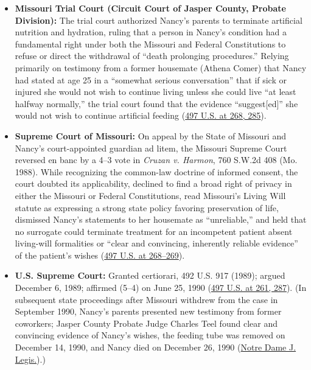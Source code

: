 \documentclass[12pt]{article}
\begin{document}
\begin{itemize}
  \item \textbf{Missouri Trial Court (Circuit Court of Jasper County, Probate Division):} The trial court authorized Nancy's parents to terminate artificial nutrition and hydration, ruling that a person in Nancy's condition had a fundamental right under both the Missouri and Federal Constitutions to refuse or direct the withdrawal of ``death prolonging procedures.'' Relying primarily on testimony from a former housemate (Athena Comer) that Nancy had stated at age 25 in a ``somewhat serious conversation'' that if sick or injured she would not wish to continue living unless she could live ``at least halfway normally,'' the trial court found that the evidence ``suggest[ed]'' she would not wish to continue artificial feeding (\href{https://supreme.justia.com/cases/federal/us/497/261/}{497 U.S. at 268, 285}).
  \item \textbf{Supreme Court of Missouri:} On appeal by the State of Missouri and Nancy's court-appointed guardian ad litem, the Missouri Supreme Court reversed en banc by a 4--3 vote in \textit{Cruzan v. Harmon}, 760 S.W.2d 408 (Mo. 1988). While recognizing the common-law doctrine of informed consent, the court doubted its applicability, declined to find a broad right of privacy in either the Missouri or Federal Constitutions, read Missouri's Living Will statute as expressing a strong state policy favoring preservation of life, dismissed Nancy's statements to her housemate as ``unreliable,'' and held that no surrogate could terminate treatment for an incompetent patient absent living-will formalities or ``clear and convincing, inherently reliable evidence'' of the patient's wishes (\href{https://supreme.justia.com/cases/federal/us/497/261/}{497 U.S. at 268--269}).
  \item \textbf{U.S. Supreme Court:} Granted certiorari, 492 U.S. 917 (1989); argued December 6, 1989; affirmed (5--4) on June 25, 1990 (\href{https://tile.loc.gov/storage-services/service/ll/usrep/usrep497/usrep497261/usrep497261.pdf}{497 U.S. at 261, 287}). (In subsequent state proceedings after Missouri withdrew from the case in September 1990, Nancy's parents presented new testimony from former coworkers; Jasper County Probate Judge Charles Teel found clear and convincing evidence of Nancy's wishes, the feeding tube was removed on December 14, 1990, and Nancy died on December 26, 1990 (\href{https://scholarship.law.nd.edu/cgi/viewcontent.cgi?article=1280&context=jleg}{Notre Dame J. Legis.}).)
\end{itemize}
\end{document}
